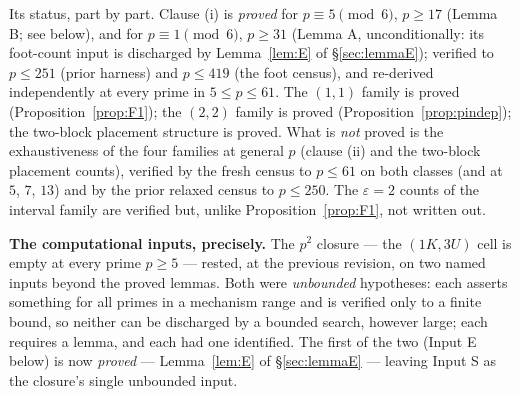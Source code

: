 \documentclass[11pt,a4paper]{article}
\numberwithin{equation}{section}
\theoremstyle{plain}
\theoremstyle{definition}
\theoremstyle{remark}
\begin{document}
Its status, part by part. Clause (i) is \emph{proved} for $p\equiv5\pmod6$,
$p\ge17$ (Lemma B; see below), and for $p\equiv1\pmod6$, $p\ge31$
(Lemma A, unconditionally: its foot-count input is discharged by
Lemma~\ref{lem:E} of \S\ref{sec:lemmaE}); verified to $p\le251$ (prior
harness) and $p\le419$ (the foot census), and re-derived independently
at every prime in $5\le p\le 61$. The $(1,1)$ family is proved (Proposition~\ref{prop:F1}); the $(2,2)$
family is proved (Proposition~\ref{prop:pindep}); the two-block placement
structure is proved. What is \emph{not} proved is the exhaustiveness of the
four families at general $p$ (clause (ii) and the two-block placement
counts), verified by the fresh census to $p\le61$ on both classes (and at
$5$, $7$, $13$) and by the prior relaxed census to $p\le250$. The
$\varepsilon=2$ counts of the interval family are verified but, unlike
Proposition~\ref{prop:F1}, not written out.

\medskip
\noindent\textbf{The computational inputs, precisely.} The $p^2$
closure --- the $(1K,3U)$ cell is empty at every prime $p\ge5$ --- rested,
at the previous revision, on two named inputs beyond the proved lemmas.
Both were \emph{unbounded} hypotheses: each asserts something for all
primes in a mechanism range and is verified only to a finite bound, so
neither can be discharged by a bounded search, however large; each
requires a lemma, and each had one identified. The first of the two
(Input E below) is now \emph{proved} --- Lemma~\ref{lem:E} of
\S\ref{sec:lemmaE} --- leaving Input S as the closure's single
unbounded input.
\end{document}
